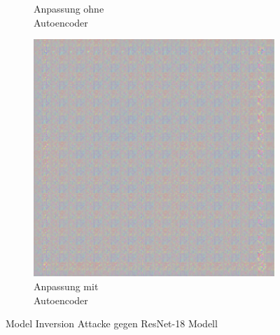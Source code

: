 \begin{figure}[!htb]
\begin{subfigure}[h]{0.3\textwidth}
  \caption{Anpassung ohne\\Autoencoder}
\end{subfigure}
\begin{subfigure}[h]{0.3\textwidth}
  \centering
  \includegraphics[width=\linewidth]{figures/autoencoder_r18/faces_mi3.png}
  \caption{Anpassung mit\\Autoencoder}
\end{subfigure}
\caption{Model Inversion Attacke gegen ResNet-18 Modell}
\label{fig:moder_inv_cr18}
\end{figure}